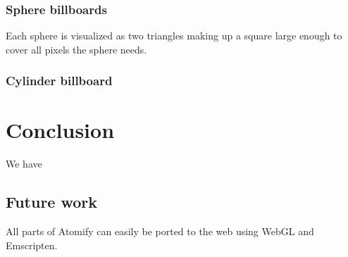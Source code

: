 \documentclass[aps,pre,twocolumn,letterpaper,floatfix,showpacs]{revtex4}
\begin{document}
\subsubsection*{Sphere billboards}
Each sphere is visualized as two triangles making up a square large enough to cover all pixels the sphere needs. 

\subsubsection*{Cylinder billboard}

\section{Conclusion}
We have

\subsection{Future work}
All parts of Atomify can easily be ported to the web using WebGL and Emscripten. 






\end{document}
